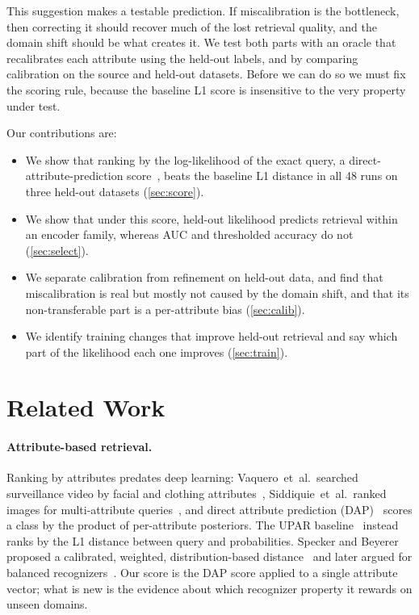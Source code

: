 \documentclass[10pt,twocolumn,letterpaper]{article}
\newcommand{\etal}{et~al.}
\begin{document}
This suggestion makes a testable prediction. If miscalibration is the bottleneck, then correcting it should recover much of the lost retrieval quality, and the domain shift should be what creates it. We test both parts with an oracle that recalibrates each attribute using the held-out labels, and by comparing calibration on the source and held-out datasets. Before we can do so we must fix the scoring rule, because the baseline L1 score is insensitive to the very property under test.

Our contributions are:
\begin{itemize}
\item We show that ranking by the log-likelihood of the exact query, a direct-attribute-prediction score~\cite{dap}, beats the baseline L1 distance in all 48 runs on three held-out datasets (\cref{sec:score}).
\item We show that under this score, held-out likelihood predicts retrieval within an encoder family, whereas AUC and thresholded accuracy do not (\cref{sec:select}).
\item We separate calibration from refinement on held-out data, and find that miscalibration is real but mostly not caused by the domain shift, and that its non-transferable part is a per-attribute bias (\cref{sec:calib}).
\item We identify training changes that improve held-out retrieval and say which part of the likelihood each one improves (\cref{sec:train}).
\end{itemize}

\section{Related Work}

\paragraph{Attribute-based retrieval.} Ranking by attributes predates deep learning: Vaquero~\etal\ searched surveillance video by facial and clothing attributes~\cite{vaquero}, Siddiquie~\etal\ ranked images for multi-attribute queries~\cite{siddiquie}, and direct attribute prediction (DAP)~\cite{dap} scores a class by the product of per-attribute posteriors. The UPAR baseline~\cite{upar} instead ranks by the L1 distance between query and probabilities. Specker and Beyerer proposed a calibrated, weighted, distribution-based distance~\cite{specker21} and later argued for balanced recognizers~\cite{specker23}. Our score is the DAP score applied to a single attribute vector; what is new is the evidence about which recognizer property it rewards on unseen domains.
\end{document}

